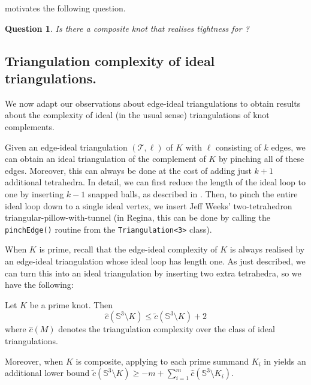 \documentclass[a4paper,UKenglish,cleveref, autoref, thm-restate]{lipics-v2021}
\newcommand{\tri}{\mathcal{T}}
\newtheorem{question}[theorem]{Question}
\begin{document}
 motivates the following question.

\begin{question}
    Is there a composite knot that realises tightness for ?
\end{question}

\subsection{Triangulation complexity of ideal triangulations.}

We now adapt our observations about edge-ideal triangulations to obtain results about the complexity of ideal (in the usual sense) triangulations of knot complements.

Given an edge-ideal triangulation $(\tri,\ell)$ of $K$ with $\ell$ consisting of $k$ edges, we can obtain an ideal triangulation of the complement of $K$ by pinching all of these edges.
Moreover, this can always be done at the cost of adding just $k+1$ additional tetrahedra.
In detail, we can first reduce the length of the ideal loop to one by inserting $k-1$ snapped balls, as described in .
Then, to pinch the entire ideal loop down to a single ideal vertex, we insert Jeff Weeks' two-tetrahedron triangular-pillow-with-tunnel
(in Regina, this can be done by calling the \texttt{pinchEdge()} routine from the \texttt{Triangulation<3>} class).

When $K$ is prime, recall that the edge-ideal complexity of $K$ is always realised by an edge-ideal triangulation whose ideal loop has length one.
As just described, we can turn this into an ideal triangulation by inserting two extra tetrahedra, so we have the following:

\begin{corollary}\label{cor:idealBound}
    Let $K$ be a prime knot. Then
    \[
        \hat{c}(\mathbb{S}^3 \setminus K) \leqslant \tilde{c}(\mathbb{S}^3 \setminus K) + 2
    \]
    where $\hat{c}(M)$ denotes the triangulation complexity over the class of ideal triangulations.
\end{corollary}

Moreover, when $K$ is composite, applying  to each prime summand $K_i$ in  yields an additional lower bound
$\tilde{c}(\mathbb{S}^3 \setminus K) \geqslant -m + \sum_{i=1}^{m} \hat{c}(\mathbb{S}^3 \setminus K_i)$.



\end{document}
